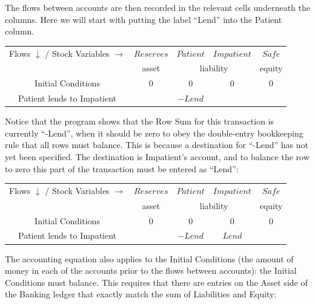The flows between accounts are then recorded in the relevant cells
underneath the columns. Here we will start with putting the label
``Lend'' into the Patient column. 

\begin{center}
\begin{tabular}{|c|cccc|}
\hline
Flows $\downarrow$ / Stock Variables $\rightarrow$&\multicolumn{1}{|c|}{$Reserves$}&\multicolumn{1}{|c|}{$Patient$}&\multicolumn{1}{|c|}{$Impatient$}&\multicolumn{1}{|c|}{$Safe$}\\\cline{2-5}&\multicolumn{1}{|c|}{asset}&\multicolumn{2}{|c|}{liability}&\multicolumn{1}{|c|}{equity}\\\hline
Initial Conditions&$0$&$0$&$0$&$0$\\
Patient lends to Impatient&&$-Lend$&&\\
\hline
\end{tabular}
\end{center}

Notice that the program shows that the Row Sum for this transaction is
currently ``-Lend'', when it should be zero to obey the double-entry
bookkeeping rule that all rows must balance. This is because a
destination for ``-Lend'' has not yet been specified. The destination
is Impatient's account, and to balance the row to zero this part of
the transaction must be entered as ``Lend'': 

\begin{center}
\begin{tabular}{|c|cccc|}
\hline
Flows $\downarrow$ / Stock Variables $\rightarrow$&\multicolumn{1}{|c|}{$Reserves$}&\multicolumn{1}{|c|}{$Patient$}&\multicolumn{1}{|c|}{$Impatient$}&\multicolumn{1}{|c|}{$Safe$}\\\cline{2-5}&\multicolumn{1}{|c|}{asset}&\multicolumn{2}{|c|}{liability}&\multicolumn{1}{|c|}{equity}\\\hline
Initial Conditions&$0$&$0$&$0$&$0$\\
Patient lends to Impatient&&$-Lend$&$Lend$&\\
\hline
\end{tabular}
\end{center}

The accounting equation also applies to the Initial Conditions (the amount of money
in each of the accounts prior to the flows between accounts): the
Initial Conditions must balance. This requires that there are
entries on the Asset side of the Banking ledger that exactly match the
sum of Liabilities and Equity: 

